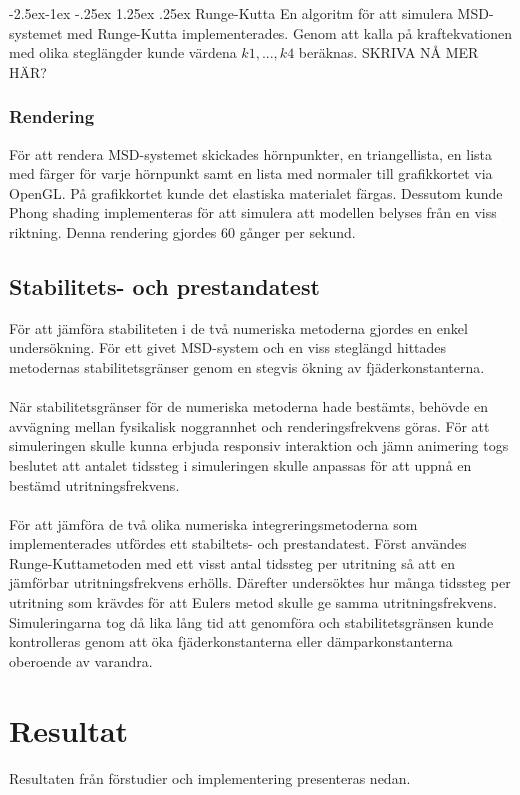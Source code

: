 \documentclass[a4paper,12pt,oneside,final,swedish]{extarticle}
\makeatletter
\renewcommand\paragraph{\@startsection{paragraph}{4}{\z@}%
            {-2.5ex\@plus -1ex \@minus -.25ex}%
            {1.25ex \@plus .25ex}%
            {\normalfont\normalsize\bfseries}}
\makeatother
\begin{document}
\paragraph{Runge-Kutta}
En algoritm för att simulera MSD-systemet med Runge-Kutta implementerades. Genom att kalla på kraftekvationen med olika steglängder kunde värdena $k1, ..., k4$ beräknas. SKRIVA NÅ MER HÄR?
\subsubsection{Rendering}
För att rendera MSD-systemet skickades hörnpunkter, en triangellista, en lista med färger för varje hörnpunkt samt en lista med normaler till grafikkortet via OpenGL. På grafikkortet kunde det elastiska materialet färgas. Dessutom kunde Phong shading implementeras för att simulera att modellen belyses från en viss riktning. Denna rendering gjordes 60 gånger per sekund.
\subsection{Stabilitets- och prestandatest}
För att jämföra stabiliteten i de två numeriska metoderna gjordes en enkel undersökning. För ett givet MSD-system och en viss steglängd hittades metodernas stabilitetsgränser genom en stegvis ökning av fjäderkonstanterna.
\\\\När stabilitetsgränser för de numeriska metoderna hade bestämts, behövde en avvägning mellan fysikalisk noggrannhet och renderingsfrekvens göras. För att simuleringen skulle kunna erbjuda responsiv interaktion och jämn animering togs beslutet att antalet tidssteg i simuleringen skulle anpassas för att uppnå en bestämd utritningsfrekvens.
\\\\För att jämföra de två olika numeriska integreringsmetoderna som implementerades utfördes ett stabiltets- och prestandatest. Först användes Runge-Kuttametoden med ett visst antal tidssteg per utritning så att en jämförbar utritningsfrekvens erhölls. Därefter undersöktes hur många tidssteg per utritning som krävdes för att Eulers metod skulle ge samma utritningsfrekvens. Simuleringarna tog då lika lång tid att genomföra och stabilitetsgränsen kunde kontrolleras genom att öka fjäderkonstanterna eller dämparkonstanterna oberoende av varandra.
\pagebreak
\section{Resultat}
Resultaten från förstudier och implementering presenteras nedan.
\end{document}
